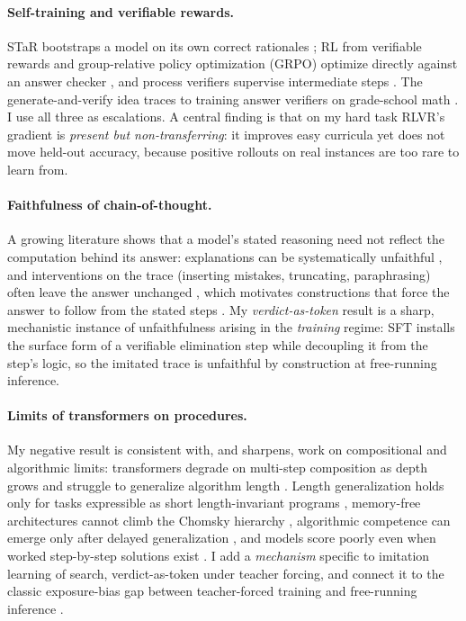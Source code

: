 \documentclass[11pt]{article}
\begin{document}
\paragraph{Self-training and verifiable rewards.} STaR bootstraps a model on its own
correct rationales \citep{zelikman2022star}; RL from verifiable rewards and group-relative
policy optimization (GRPO) optimize directly against an answer checker
\citep{shao2024deepseekmath, guo2025deepseekr1, lambert2024tulu3}, and process verifiers
supervise intermediate steps \citep{lightman2023verify}. The generate-and-verify idea traces
to training answer verifiers on grade-school math \citep{cobbe2021gsm8k}. I use all three as
escalations. A central finding is that on my hard task RLVR's gradient is \emph{present but
non-transferring}: it improves easy curricula yet does not move held-out accuracy, because
positive rollouts on real instances are too rare to learn from.

\paragraph{Faithfulness of chain-of-thought.} A growing literature shows that a model's
stated reasoning need not reflect the computation behind its answer: explanations can be
systematically unfaithful \citep{turpin2023unfaithful}, and interventions on the trace
(inserting mistakes, truncating, paraphrasing) often leave the answer unchanged
\citep{lanham2023measuring}, which motivates constructions that force the answer to follow
from the stated steps \citep{lyu2023faithful}. My \emph{verdict-as-token} result is a sharp,
mechanistic instance of unfaithfulness arising in the \emph{training} regime: SFT installs the
surface form of a verifiable elimination step while decoupling it from the step's logic, so
the imitated trace is unfaithful by construction at free-running inference.

\paragraph{Limits of transformers on procedures.} My negative result is consistent with,
and sharpens, work on compositional and algorithmic limits: transformers degrade on
multi-step composition as depth grows \citep{dziri2023faith} and struggle to generalize
algorithm length \citep{anil2022length}. Length generalization holds only for tasks
expressible as short length-invariant programs \citep{zhou2024algorithms}, memory-free
architectures cannot climb the Chomsky hierarchy \citep{deletang2023chomsky}, algorithmic
competence can emerge only after delayed generalization \citep{power2022grokking}, and models
score poorly even when worked step-by-step solutions exist \citep{hendrycks2021math}. I add a
\emph{mechanism} specific to imitation learning of search, verdict-as-token under teacher
forcing, and connect it to the classic
exposure-bias gap between teacher-forced training and free-running inference
\citep{bengio2015scheduled, ranzato2016sequence}.
\end{document}

